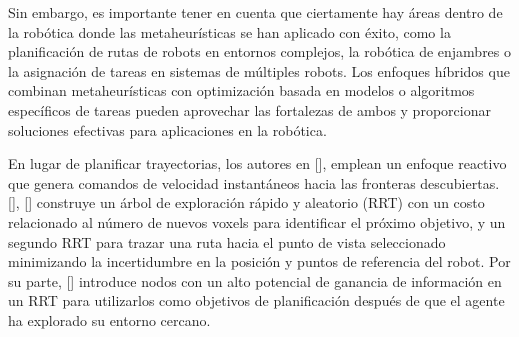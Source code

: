     

Sin embargo, es importante tener en cuenta que ciertamente hay \'{a}reas dentro de la rob\'{o}tica donde las metaheur\'{i}sticas se han aplicado con \'{e}xito, como la planificaci\'{o}n de rutas de robots en entornos complejos, la rob\'{o}tica de enjambres o la asignaci\'{o}n de tareas en sistemas de m\'{u}ltiples robots. Los enfoques h\'{i}bridos que combinan metaheur\'{i}sticas con optimizaci\'{o}n basada en modelos o algoritmos espec\'{i}ficos de tareas pueden aprovechar las fortalezas de ambos y proporcionar soluciones efectivas para aplicaciones en la rob\'{o}tica.

En lugar de planificar trayectorias, los autores en \citeauthor{CIESLEWSKI2017}[], emplean un enfoque reactivo que genera comandos de velocidad instantáneos hacia las fronteras descubiertas. \citeauthor{PAPACHRISTOS2017}[], \citeauthor{CINVES2021}[] construye un árbol de exploración rápido y aleatorio (RRT) con un costo relacionado al número de nuevos voxels para identificar el próximo objetivo, y un segundo RRT para trazar una ruta hacia el punto de vista seleccionado minimizando la incertidumbre en la posición y puntos de referencia del robot. Por su parte, \citeauthor{SELIN2019}[] introduce nodos con un alto potencial de ganancia de información en un RRT para utilizarlos como objetivos de planificación después de que el agente ha explorado su entorno cercano.

